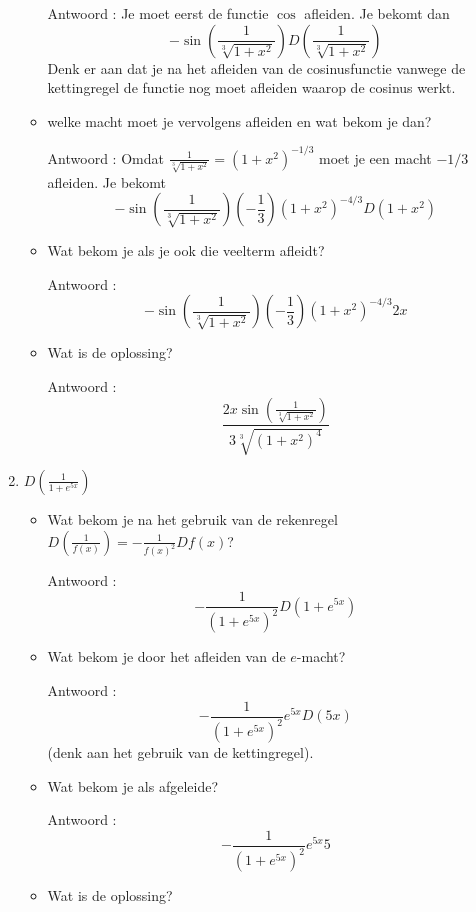 \begin{enumerate}
\begin{itemize}
		Antwoord : Je moet eerst de functie $\cos$ afleiden. Je bekomt dan
		\[
		-\sin \left(  \frac{1}{\sqrt[3]{1+x^2}} \right) D \left(  \frac{1}{\sqrt[3]{1+x^2}} \right) 
		\]
		Denk er aan dat je na het afleiden van de cosinusfunctie vanwege de kettingregel de functie nog moet afleiden waarop de cosinus werkt.
		
		\item welke macht moet je vervolgens afleiden en wat bekom je dan?
		
		Antwoord : Omdat $\frac{1}{\sqrt[3]{1+x^2}}=\left( 1+x^2  \right)^{-1/3}$ moet je een macht $-1/3$ afleiden. Je bekomt
		\[
		-\sin \left(  \frac{1}{\sqrt[3]{1+x^2}} \right) \left( -\frac{1}{3}  \right) \left( 1+x^2  \right)^{-4/3}D\left( 1+x^2  \right)
		\]
		
		\item Wat bekom je als je ook die veelterm afleidt?
		
		Antwoord : \[-\sin \left(  \frac{1}{\sqrt[3]{1+x^2}} \right) \left( -\frac{1}{3}  \right) \left( 1+x^2  \right)^{-4/3}2x\]
		
		\item Wat is de oplossing?
		
		Antwoord : \[\frac {2x\sin \left( \frac {1}{\sqrt[3]{1+x^2}} \right)}{3 \sqrt[3]{\left( 1+x^2  \right) ^4}}\]
		
	\end{itemize}
	
	\item $D \left( \frac {1}{1+e^{5x}} \right)$
	
	\begin{itemize}
		
		\item Wat bekom je na het gebruik van de rekenregel $D \left( \frac{1}{f(x)} \right)=-\frac {1}{f(x)^2}Df(x)$?
		
		Antwoord : \[-\frac{1}{\left( 1+e^{5x}  \right)^2}D \left ( 1+e^{5x} \right)\]
		
		\item Wat bekom je door het afleiden van de $e$-macht?
		
		Antwoord : \[-\frac{1}{\left( 1+e^{5x}  \right)^2}e^{5x}D(5x)\] (denk aan het gebruik van de kettingregel).
		
		\item Wat bekom je als afgeleide?
		
		Antwoord : \[-\frac{1}{\left( 1+e^{5x}  \right)^2}e^{5x}5\]
		
		\item Wat is de oplossing?
		

\end{itemize}
\end{enumerate}
